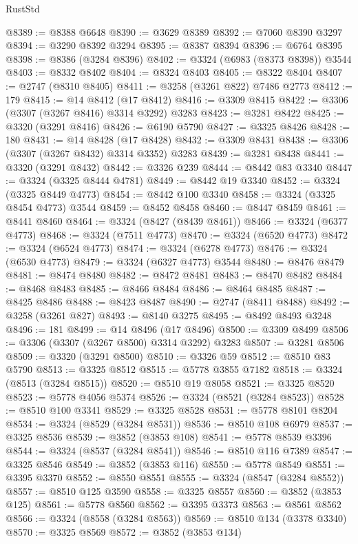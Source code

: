 \begin{lexlean}{RustStd}
\begin{coremodule}
@8389 := @8388 @6648
@8390 := @3629 @8389
@8392 := @7060 @8390 @3297
@8394 := @3290 @8392 @3294
@8395 := @8387 @8394
@8396 := @6764 @8395
@8398 := @8386 (@3284 @8396)
@8402 := @3324 (@6983 (@8373 @8398)) @3544
@8403 := @8332 @8402
@8404 := @8324 @8403
@8405 := @8322 @8404
@8407 := @2747 (@8310 @8405)
@8411 := @3258 (@3261 @822) @7486 @2773
@8412 := 179
@8415 := @14 @8412 (@17 @8412)
@8416 := @3309 @8415
@8422 := @3306 (@3307 (@3267 @8416) @3314 @3292) @3283
@8423 := @3281 @8422
@8425 := @3320 (@3291 @8416)
@8426 := @6190 @5790
@8427 := @3325 @8426
@8428 := 180
@8431 := @14 @8428 (@17 @8428)
@8432 := @3309 @8431
@8438 := @3306 (@3307 (@3267 @8432) @3314 @3352) @3283
@8439 := @3281 @8438
@8441 := @3320 (@3291 @8432)
@8442 := @3326 @239
@8444 := @8442 @83 @3340
@8447 := @3324 (@3325 @8444 @4781)
@8449 := @8442 @19 @3340
@8452 := @3324 (@3325 @8449 @4773)
@8454 := @8442 @100 @3340
@8458 := @3324 (@3325 @8454 @4773) @3544
@8459 := @8452 @8458
@8460 := @8447 @8459
@8461 := @8441 @8460
@8464 := @3324 (@8427 (@8439 @8461))
@8466 := @3324 (@6377 @4773)
@8468 := @3324 (@7511 @4773)
@8470 := @3324 (@6520 @4773)
@8472 := @3324 (@6524 @4773)
@8474 := @3324 (@6278 @4773)
@8476 := @3324 (@6530 @4773)
@8479 := @3324 (@6327 @4773) @3544
@8480 := @8476 @8479
@8481 := @8474 @8480
@8482 := @8472 @8481
@8483 := @8470 @8482
@8484 := @8468 @8483
@8485 := @8466 @8484
@8486 := @8464 @8485
@8487 := @8425 @8486
@8488 := @8423 @8487
@8490 := @2747 (@8411 @8488)
@8492 := @3258 (@3261 @827)
@8493 := @8140 @3275
@8495 := @8492 @8493 @3248
@8496 := 181
@8499 := @14 @8496 (@17 @8496)
@8500 := @3309 @8499
@8506 := @3306 (@3307 (@3267 @8500) @3314 @3292) @3283
@8507 := @3281 @8506
@8509 := @3320 (@3291 @8500)
@8510 := @3326 @59
@8512 := @8510 @83 @5790
@8513 := @3325 @8512
@8515 := @5778 @3855 @7182
@8518 := @3324 (@8513 (@3284 @8515))
@8520 := @8510 @19 @8058
@8521 := @3325 @8520
@8523 := @5778 @4056 @5374
@8526 := @3324 (@8521 (@3284 @8523))
@8528 := @8510 @100 @3341
@8529 := @3325 @8528
@8531 := @5778 @8101 @8204
@8534 := @3324 (@8529 (@3284 @8531))
@8536 := @8510 @108 @6979
@8537 := @3325 @8536
@8539 := @3852 (@3853 @108)
@8541 := @5778 @8539 @3396
@8544 := @3324 (@8537 (@3284 @8541))
@8546 := @8510 @116 @7389
@8547 := @3325 @8546
@8549 := @3852 (@3853 @116)
@8550 := @5778 @8549
@8551 := @3395 @3370
@8552 := @8550 @8551
@8555 := @3324 (@8547 (@3284 @8552))
@8557 := @8510 @125 @3590
@8558 := @3325 @8557
@8560 := @3852 (@3853 @125)
@8561 := @5778 @8560
@8562 := @3395 @3373
@8563 := @8561 @8562
@8566 := @3324 (@8558 (@3284 @8563))
@8569 := @8510 @134 (@3378 @3340)
@8570 := @3325 @8569
@8572 := @3852 (@3853 @134)

\end{coremodule}
\end{lexlean}
